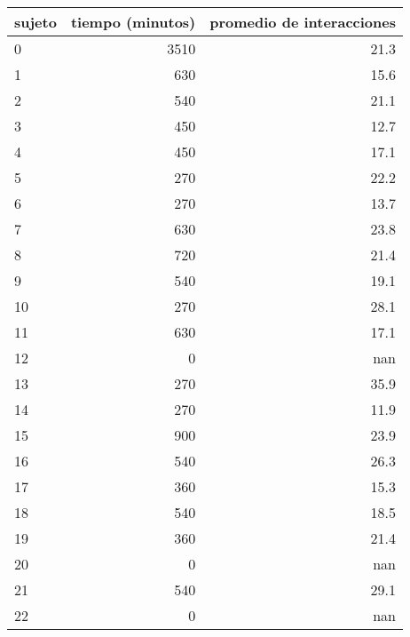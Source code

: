 \documentclass[spanish]{article}
\begin{document}
\begin{table}[h!]
\begin{center}
\begin{tabular}{|l|r|r|}
\hline
sujeto & tiempo (minutos) & promedio de interacciones\\ \hline
     0 &             3510 &                      21.3\\ \hline
     1 &              630 &                      15.6\\ \hline
     2 &              540 &                      21.1\\ \hline
     3 &              450 &                      12.7\\ \hline
     4 &              450 &                      17.1\\ \hline
     5 &              270 &                      22.2\\ \hline
     6 &              270 &                      13.7\\ \hline
     7 &              630 &                      23.8\\ \hline
     8 &              720 &                      21.4\\ \hline
     9 &              540 &                      19.1\\ \hline
    10 &              270 &                      28.1\\ \hline
    11 &              630 &                      17.1\\ \hline
    12 &                0 &                       nan\\ \hline
    13 &              270 &                      35.9\\ \hline
    14 &              270 &                      11.9\\ \hline
    15 &              900 &                      23.9\\ \hline
    16 &              540 &                      26.3\\ \hline
    17 &              360 &                      15.3\\ \hline
    18 &              540 &                      18.5\\ \hline
    19 &              360 &                      21.4\\ \hline
    20 &                0 &                       nan\\ \hline
    21 &              540 &                      29.1\\ \hline
    22 &                0 &                       nan\\ \hline

\end{tabular}
\end{center}
\end{table}
\end{document}
